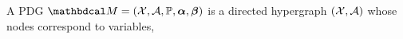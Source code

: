 \documentclass[twoside]{article}
\newcommand\vjoe[1]{{\color{joecolor}\textbf{$\boldsymbol\{$Joe: }#1 \textbf{$\boldsymbol\}$}}}
\newcommand\voli[1]{{\color{olicolor}\textbf{$\boldsymbol\{$Oli: }#1 \textbf{$\boldsymbol\}$}}}
\begin{document}
\begin{defn}
    A PDG $\dg M = (\X, \Ar,
        \mathbb P, 
        \balpha, \bbeta )
    $
    is     
    a directed hypergraph 
    $(\mathcal X, \mathcal A)$ 
    whose nodes correspond to variables,

\end{defn}
\end{document}
